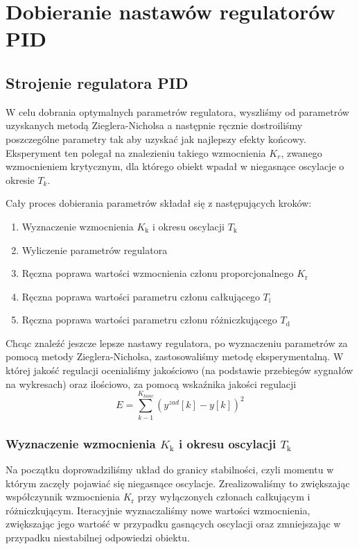 \chapter{Dobieranie nastawów regulatorów PID}
\label{zad5}

\section{Strojenie regulatora PID}
\label{zad5_PID_wykresy}
W celu dobrania optymalnych parametrów regulatora, wyszliśmy od parametrów uzyskanych metodą
Zieglera-Nicholsa a następnie ręcznie dostroiliśmy poszczególne parametry tak aby uzyskać
jak najlepszy efekty końcowy. Eksperyment ten polegał na znalezieniu takiego wzmocnienia $K_{r}$, 
zwanego wzmocnieniem krytycznym, dla którego obiekt wpadał w niegasnące oscylacje o okresie $T_{k}$. 

Cały proces dobierania parametrów składał się z następujących kroków:
\begin{center}
\begin{enumerate}
    \item Wyznaczenie wzmocnienia $K_{\mathrm{k}}$ i okresu oscylacji $T_{\mathrm{k}}$
    \item Wyliczenie parametrów regulatora
    \item Ręczna poprawa wartości wzmocnienia członu proporcjonalnego $K_{\mathrm{r}}$
    \item Ręczna poprawa wartości parametru członu całkującego $T_{\mathrm{i}}$
    \item Ręczna poprawa wartości parametru członu różniczkującego $T_{\mathrm{d}}$
\end{enumerate}
\end{center}

Chcąc znaleźć jeszcze lepsze nastawy regulatora, po wyznaczeniu parametrów za pomocą metody Zieglera-Nicholsa, zastosowaliśmy metodę eksperymentalną. W której jakość regulacji ocenialiśmy jakościowo (na podstawie przebiegów sygnałów na wykresach) oraz ilościowo, za pomocą wskaźnika jakości regulacji
\begin{equation}
E=\sum_{k-1}^{K_{konc}}(y^{zad}[k]-y[k])^{2}
\end{equation}
\subsection{Wyznaczenie wzmocnienia $K_{\mathrm{k}}$ i okresu oscylacji $T_{\mathrm{k}}$}
Na początku doprowadziliśmy układ do granicy stabilności, czyli momentu
w którym zaczęły pojawiać się niegasnące oscylacje. Zrealizowaliśmy to
zwiększając współczynnik wzmocnienia $K_{\mathrm{r}}$ przy wyłączonych członach 
całkującym i różniczkującym. Iteracyjnie wyznaczaliśmy nowe wartości wzmocnienia,
zwiększając jego wartość w przypadku gasnących oscylacji oraz zmniejszając w przypadku
niestabilnej odpowiedzi obiektu.

